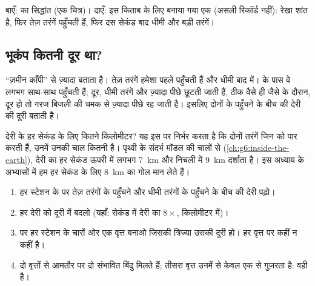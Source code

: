 \begin{omfigure}
{\small बाएँ:  का सिद्धांत (एक चित्र)। दाएँ: इस किताब के लिए बनाया गया
एक  (असली रिकॉर्ड नहीं): रेखा शांत है, फिर तेज़ तरंगें पहुँचती हैं, फिर
दस सेकंड बाद धीमी और बड़ी
तरंगें।}
\label{fig:g7:earthquakes:seismometer}
\end{omfigure}

\subsection*{भूकंप कितनी दूर था?}

 ``ज़मीन काँपी'' से ज़्यादा बताता है। तेज़ तरंगें हमेशा पहले पहुँचती हैं
और धीमी बाद में।  के पास वे लगभग साथ-साथ पहुँचती हैं; दूर, धीमी तरंगें
और ज़्यादा पीछे छूटती जाती हैं, ठीक वैसे ही जैसे  के दौरान,  दूर हो तो
गरज बिजली की चमक से ज़्यादा पीछे रह जाती है। इसलिए दोनों के पहुँचने के बीच की
देरी  की दूरी बताती है।

देरी के हर सेकंड के लिए कितने किलोमीटर? यह इस पर निर्भर करता है कि दोनों तरंगें
जिन  को पार करती हैं, उनमें उनकी चाल कितनी है। पृथ्वी के संदर्भ मॉडल की
चालों से (\cref{ch:g6:inside-the-earth}), देरी का हर सेकंड ऊपरी  में
लगभग \qty{7}{km} और निचली  में \qty{9}{km} दर्शाता है। इस अध्याय के
अभ्यासों में हम हर सेकंड के लिए \qty{8}{km} का गोल मान लेते
हैं।

\begin{method}[तीन स्टेशनों से अधिकेंद्र ढूँढना]\label{met:g7:earthquakes:three-circles}
\begin{enumerate}
  \item हर स्टेशन के  पर तेज़ तरंगों के पहुँचने और धीमी तरंगों के पहुँचने
        के बीच की देरी पढ़ो।
  \item हर देरी को दूरी में बदलो (यहाँ: सेकंड में देरी का $8 \times$, किलोमीटर
        में)।
  \item {} पर हर स्टेशन के चारों ओर एक वृत्त बनाओ जिसकी त्रिज्या उसकी दूरी
        हो।  हर वृत्त पर कहीं न कहीं है।
  \item दो वृत्तों से आमतौर पर दो संभावित बिंदु मिलते हैं; तीसरा वृत्त उनमें से
        केवल एक से गुज़रता है: वही  है।
\end{enumerate}
\end{method}

